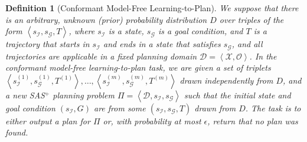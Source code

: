 \documentclass{article}
\newtheorem{definition}{Definition}
\newcommand{\tuple}[1]{\ensuremath{\left \langle #1 \right \rangle }}
\newcommand{\SAS}{SAS$^+$}
\begin{document}
	\begin{definition}[Conformant Model-Free Learning-to-Plan] We suppose that there is an arbitrary, unknown (prior) probability distribution $D$ over triples of the form $\tuple{s_\mathcal{I}, s_\mathcal{G}, T}$, where $s_\mathcal{I}$ is a state, $s_\mathcal{G}$ is a goal condition, and $T$ is a trajectory that starts in $s_\mathcal{I}$ and ends in a state that satisfies $s_\mathcal{G}$, 
		and all trajectories are applicable in a fixed planning domain $\mathcal{D}=\tuple{\mathcal{X}, \mathcal{O}}$. 
		In the conformant model-free learning-to-plan task, we are given a set of triplets $\tuple{s_\mathcal{I}^{(1)},s_\mathcal{G}^{(1)},T^{(1)}},\ldots,\tuple{s_\mathcal{I}^{(m)},s_\mathcal{G}^{(m)},T^{(m)}}$ drawn independently from $D$, 
		and a new \SAS{} planning problem $\Pi=\tuple{\mathcal{D}, s_\mathcal{I}, s_\mathcal{G}}$  
		such that the initial state and goal condition $(s_\mathcal{I},G)$ are from some $(s_\mathcal{I},s_\mathcal{G},T)$ drawn from $D$. 
		The task is to either output a plan for $\Pi$ or, with probability at most $\epsilon$, return that no plan was found.
		\label{def:learning-to-plan}
	\end{definition}
	
	
	
\end{document}
